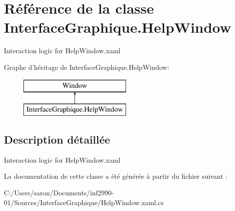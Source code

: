\hypertarget{class_interface_graphique_1_1_help_window}{\section{Référence de la classe Interface\-Graphique.\-Help\-Window}
\label{class_interface_graphique_1_1_help_window}
}


Interaction logic for Help\-Window.\-xaml  


Graphe d'héritage de Interface\-Graphique.\-Help\-Window\-:\begin{figure}[H]
\begin{center}
\leavevmode
\includegraphics[height=2.000000cm]{class_interface_graphique_1_1_help_window}
\end{center}
\end{figure}


\subsection{Description détaillée}
Interaction logic for Help\-Window.\-xaml 



La documentation de cette classe a été générée à partir du fichier suivant \-:\begin{DoxyCompactItemize}
\item 
C\-:/\-Users/saron/\-Documents/inf2990-\/01/\-Sources/\-Interface\-Graphique/Help\-Window.\-xaml.\-cs\end{DoxyCompactItemize}
